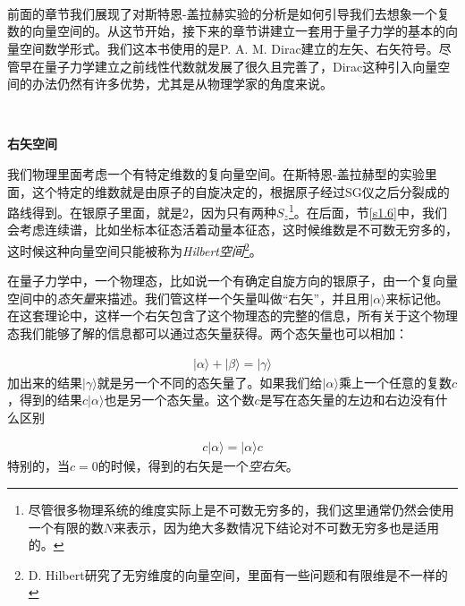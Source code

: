 \documentclass[UTF8,twoside]{ctexart}
\begin{document}
\noindent \\

\noindent {}  \\

\

\noindent 前面的章节我们展现了对斯特恩-盖拉赫实验的分析是如何引导我们去想象一个复数的向量空间的。从这节开始，接下来的章节讲建立一套用于量子力学的基本的向量空间数学形式。我们这本书使用的是P. A. M. Dirac建立的左矢、右矢符号。尽管早在量子力学建立之前线性代数就发展了很久且完善了，Dirac这种引入向量空间的办法仍然有许多优势，尤其是从物理学家的角度来说。

\ 

\noindent \textbf{右矢空间}

\noindent 我们物理里面考虑一个有特定维数的复向量空间。在斯特恩-盖拉赫型的实验里面，这个特定的维数就是由原子的自旋决定的，根据原子经过SG仪之后分裂成的路线得到。在银原子里面，就是$2$，因为只有两种$S_z$\footnote{尽管很多物理系统的维度实际上是不可数无穷多的，我们这里通常仍然会使用一个有限的数$N$来表示，因为绝大多数情况下结论对不可数无穷多也是适用的。}。在后面，节\ref{s1.6}中，我们会考虑连续谱，比如坐标本征态活着动量本征态，这时候维数是不可数无穷多的，这时候这种向量空间只能被称为\emph{Hilbert空间}\footnote{D. Hilbert研究了无穷维度的向量空间，里面有一些问题和有限维是不一样的}。

在量子力学中，一个物理态，比如说一个有确定自旋方向的银原子，由一个复向量空间中的{\emph{态矢量}}来描述。我们管这样一个矢量叫做“右矢”，并且用$|\alpha\rangle$来标记他。在这套理论中，这样一个右矢包含了这个物理态的完整的信息，所有关于这个物理态我们能够了解的信息都可以通过态矢量获得。两个态矢量也可以相加：

\begin{align}
|\alpha\rangle + |\beta\rangle = |\gamma\rangle
\end{align}
加出来的结果$|\gamma\rangle$就是另一个不同的态矢量了。如果我们给$|\alpha\rangle$乘上一个任意的复数$c$，得到的结果$c|\alpha\rangle$也是另一个态矢量。这个数$c$是写在态矢量的左边和右边没有什么区别

\begin{align}
c|\alpha\rangle = |\alpha\rangle c
\end{align}
特别的，当$c=0$的时候，得到的右矢是一个{\emph{空右矢}}。
\end{document}
